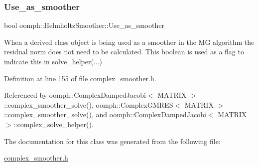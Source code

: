 \subsubsection{\texorpdfstring{Use\+\_\+as\+\_\+smoother}{Use\_as\_smoother}}
{\footnotesize\ttfamily bool oomph\+::\+Helmholtz\+Smoother\+::\+Use\+\_\+as\+\_\+smoother\hspace{0.3cm}{\ttfamily [protected]}}



When a derived class object is being used as a smoother in the MG algorithm the residual norm does not need to be calculated. This boolean is used as a flag to indicate this in solve\+\_\+helper(...) 



Definition at line 155 of file complex\+\_\+smoother.\+h.



Referenced by oomph\+::\+Complex\+Damped\+Jacobi$<$ M\+A\+T\+R\+I\+X $>$\+::complex\+\_\+smoother\+\_\+solve(), oomph\+::\+Complex\+G\+M\+R\+E\+S$<$ M\+A\+T\+R\+I\+X $>$\+::complex\+\_\+smoother\+\_\+solve(), and oomph\+::\+Complex\+Damped\+Jacobi$<$ M\+A\+T\+R\+I\+X $>$\+::complex\+\_\+solve\+\_\+helper().



The documentation for this class was generated from the following file\+:\begin{DoxyCompactItemize}
\item 
\hyperlink{complex__smoother_8h}{complex\+\_\+smoother.\+h}\end{DoxyCompactItemize}
